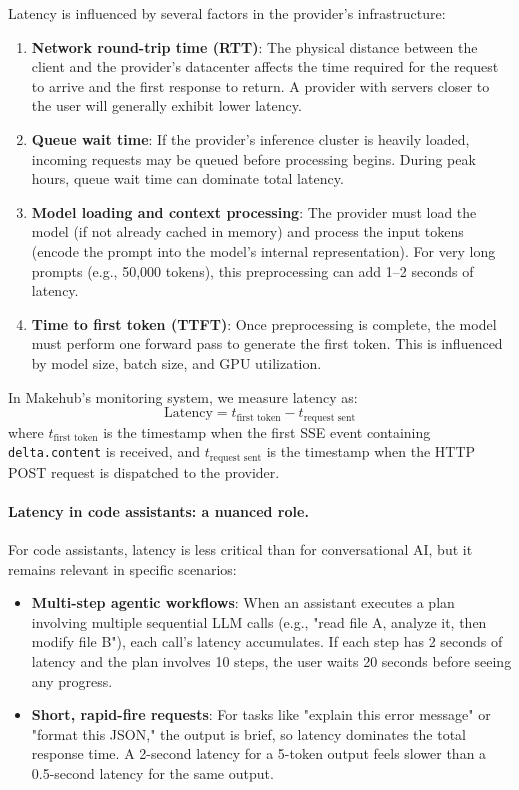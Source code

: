 \documentclass[english]{article}
\begin{document}
Latency is influenced by several factors in the provider's infrastructure:
\begin{enumerate}
    \item \textbf{Network round-trip time (RTT)}: The physical distance between the client and the provider's datacenter affects the time required for the request to arrive and the first response to return. A provider with servers closer to the user will generally exhibit lower latency.
    \item \textbf{Queue wait time}: If the provider's inference cluster is heavily loaded, incoming requests may be queued before processing begins. During peak hours, queue wait time can dominate total latency.
    \item \textbf{Model loading and context processing}: The provider must load the model (if not already cached in memory) and process the input tokens (encode the prompt into the model's internal representation). For very long prompts (e.g., 50,000 tokens), this preprocessing can add 1--2 seconds of latency.
    \item \textbf{Time to first token (TTFT)}: Once preprocessing is complete, the model must perform one forward pass to generate the first token. This is influenced by model size, batch size, and GPU utilization.
\end{enumerate}

In Makehub's monitoring system, we measure latency as:
\[
\text{Latency} = t_{\text{first token}} - t_{\text{request sent}}
\]
where $t_{\text{first token}}$ is the timestamp when the first SSE event containing \texttt{delta.content} is received, and $t_{\text{request sent}}$ is the timestamp when the HTTP POST request is dispatched to the provider.

\paragraph{Latency in code assistants: a nuanced role.}

For code assistants, latency is less critical than for conversational AI, but it remains relevant in specific scenarios:
\begin{itemize}
    \item \textbf{Multi-step agentic workflows}: When an assistant executes a plan involving multiple sequential LLM calls (e.g., "read file A, analyze it, then modify file B"), each call's latency accumulates. If each step has 2 seconds of latency and the plan involves 10 steps, the user waits 20 seconds before seeing any progress.
    \item \textbf{Short, rapid-fire requests}: For tasks like "explain this error message" or "format this JSON," the output is brief, so latency dominates the total response time. A 2-second latency for a 5-token output feels slower than a 0.5-second latency for the same output.
\end{itemize}
\end{document}

